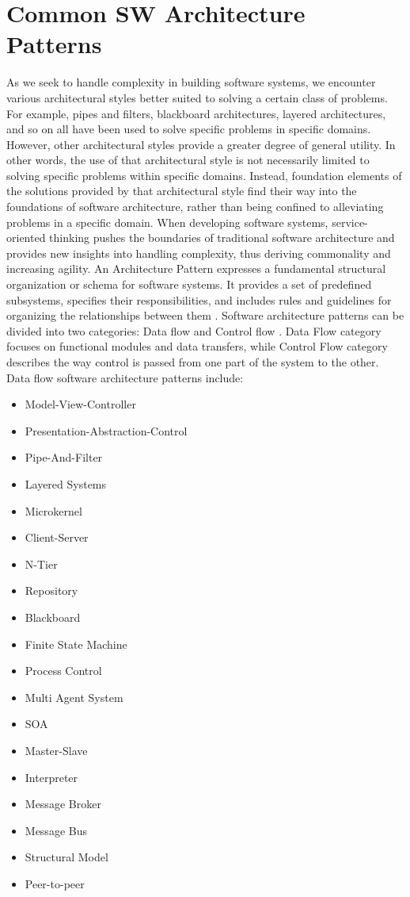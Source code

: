 \documentclass[12pt,a4paper,final,twoside,onecolumn,titlepage]{book}
\begin{document}
\section{Common SW Architecture Patterns}
As we seek to handle complexity in building software systems, we encounter various architectural styles better suited to solving a certain class of problems. For example, pipes and filters, blackboard architectures, layered architectures, and so on all have been used to solve specific problems in specific domains. However, other architectural styles provide a greater degree of general utility. In other words, the use of that architectural style is not necessarily limited to solving specific problems within specific domains. Instead, foundation elements of the solutions provided by that architectural style find their way into the foundations of software architecture, rather than being confined to alleviating problems in a specific domain. When developing software systems, service- oriented thinking pushes the boundaries of traditional software architecture and provides new insights into handling complexity, thus deriving commonality and increasing agility. An Architecture Pattern expresses a fundamental structural organization or schema for software systems. It provides a set of predefined subsystems, specifies their responsibilities, and includes rules and guidelines for organizing the relationships between them \cite{M09}. Software architecture patterns can be divided into two categories: Data flow and Control flow \cite{M07,M10}. Data Flow category focuses on functional modules and data transfers, while Control Flow category describes the way control is passed from one part of the system to the other. Data flow software architecture patterns include:
\begin{itemize}
\item Model-View-Controller
\item Presentation-Abstraction-Control
\item Pipe-And-Filter
\item Layered Systems
\item Microkernel
\item Client-Server
\item N-Tier
\item Repository
\item Blackboard
\item Finite State Machine
\item Process Control
\item Multi Agent System
\item \gls{SOA} 
\item Master-Slave
\item Interpreter
\item Message Broker
\item Message Bus
\item Structural Model
\item Peer-to-peer
\end{itemize}
\end{document}
